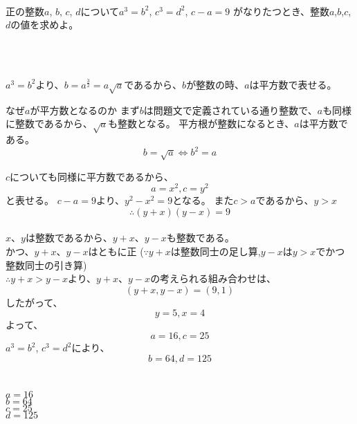 \documentclass{jsarticle}
\begin{document}
  \begin{screen}
     \\
    正の整数$a$, $b$, $c$, $d$について$a^3=b^2$, $c^3=d^2$, $c-a=9$ がなりたつとき、整数$a$,$b$,$c$,$d$の値を求めよ。
  \end{screen}
  \\
  \dotfill

   \\
  $a^3=b^2$より、$b=a^\frac{3}{2}=a\sqrt{a}$であるから、$b$が整数の時、$a$は平方数で表せる。\\
  \begin{itembox}[l]{なぜ$a$が平方数となるのか}
    まず$b$は問題文で定義されている通り整数で、$a$も同様に整数であるから、$\sqrt{a}$も整数となる。
    平方根が整数になるとき、$a$は平方数である。
    \[b=\sqrt{a} \iff b^2=a\]
  \end{itembox}
  $c$についても同様に平方数であるから、
  \[a=x^2, c=y^2\]
  と表せる。
  $c-a=9$より、$y^2-x^2=9$となる。
  また$c>a$であるから、$y>x$\\
  \[\therefore (y+x)(y-x)=9\] \\
  $x$、$y$は整数であるから、$y+x$、$y-x$も整数である。\\
  かつ、$y+x$、$y-x$はともに正
  ($\because y+x$は整数同士の足し算,$y-x$は$y>x$でかつ整数同士の引き算)\\
  $\therefore y+x>y-x$より、$ y+x$、$y-x$の考えられる組み合わせは、\\
  \[(y+x, y-x)=(9,1)\]
  したがって、\\
  \[y=5, x=4\]
  よって、\\
  \[a=16, c=25\]
  $a^3=b^2$, $c^3=d^2$により、\\
  \[b=64, d=125\]
  \\
  \\
  $a=16$\\
  $b=64$\\
  $c=25$\\
  $d=125$\\
\end{document}
